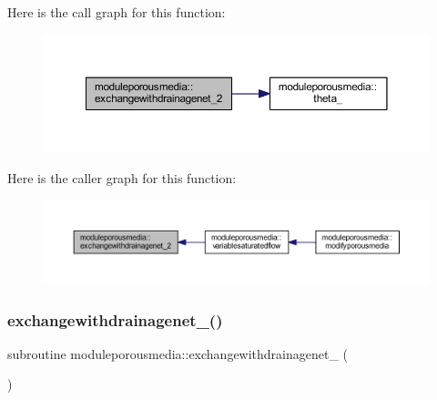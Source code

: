Here is the call graph for this function\+:\nopagebreak
\begin{figure}[H]
\begin{center}
\leavevmode
\includegraphics[width=350pt]{namespacemoduleporousmedia_a7459ca0efe1499228194caae424c0f28_cgraph}
\end{center}
\end{figure}
Here is the caller graph for this function\+:\nopagebreak
\begin{figure}[H]
\begin{center}
\leavevmode
\includegraphics[width=350pt]{namespacemoduleporousmedia_a7459ca0efe1499228194caae424c0f28_icgraph}
\end{center}
\end{figure}
\mbox{\label{namespacemoduleporousmedia_a3a50b72fe18c884e4924b75c7d58d2c6}} 
\subsubsection{\texorpdfstring{exchangewithdrainagenet\+\_()}{exchangewithdrainagenet\_3()}}
{\footnotesize\ttfamily subroutine moduleporousmedia\+::exchangewithdrainagenet\+\_ (\begin{DoxyParamCaption}{ }\end{DoxyParamCaption})\hspace{0.3cm}{\ttfamily [private]}}

